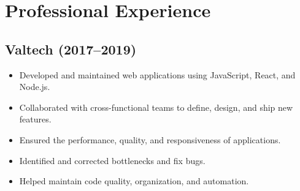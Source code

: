 \section{Professional Experience}

\subsection*{Valtech (2017--2019)}
\label{sec:valtech}
\begin{itemize}
    \item Developed and maintained web applications using JavaScript, React, and Node.js.
    \item Collaborated with cross-functional teams to define, design, and ship new features.
    \item Ensured the performance, quality, and responsiveness of applications.
    \item Identified and corrected bottlenecks and fix bugs.
    \item Helped maintain code quality, organization, and automation.
\end{itemize}